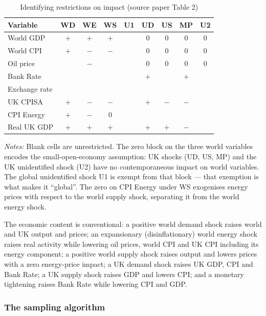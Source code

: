 \begin{table}[t]
\centering
\caption{Identifying restrictions on impact (source paper Table 2)}
\label{tab:restrictions}
\small
\begin{tabular}{lcccccccc}
\toprule
Variable & WD & WE & WS & U1 & UD & US & MP & U2 \\
\midrule
World GDP    & $+$ & $+$ & $+$ &  & 0 & 0 & 0 & 0 \\
World CPI    & $+$ & $-$ & $-$ &  & 0 & 0 & 0 & 0 \\
Oil price    &     & $-$ &     &  & 0 & 0 & 0 & 0 \\
Bank Rate    &     &     &     &  & $+$ &     & $+$ &  \\
Exchange rate&     &     &     &  &     &     &     &  \\
UK CPISA     & $+$ & $-$ & $-$ &  & $+$ & $-$ & $-$ &  \\
CPI Energy   & $+$ & $-$ & 0   &  &     &     &     &  \\
Real UK GDP  & $+$ & $+$ & $+$ &  & $+$ & $+$ & $-$ &  \\
\bottomrule
\end{tabular}
\par\smallskip
\parbox{0.92\textwidth}{\footnotesize \emph{Notes:} Blank cells are unrestricted. The zero block on the three world variables encodes the small-open-economy assumption: UK shocks (UD, US, MP) and the UK unidentified shock (U2) have no contemporaneous impact on world variables. The global unidentified shock U1 is exempt from that block --- that exemption is what makes it ``global''. The zero on CPI Energy under WS exogenises energy prices with respect to the world supply shock, separating it from the world energy shock.}
\end{table}

The economic content is conventional: a positive world demand shock raises world and UK output and prices; an expansionary (disinflationary) world energy shock raises real activity while lowering oil prices, world CPI and UK CPI including its energy component; a positive world supply shock raises output and lowers prices with a zero energy-price impact; a UK demand shock raises UK GDP, CPI and Bank Rate; a UK supply shock raises GDP and lowers CPI; and a monetary tightening raises Bank Rate while lowering CPI and GDP.

\subsubsection{The sampling algorithm}
\label{sec:identification-math}


